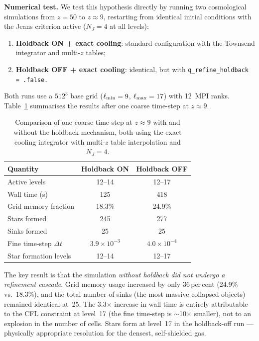 \documentclass[fleqn,usenatbib]{mnras}
\newcommand{\code}[1]{\texttt{#1}}
\begin{document}
\textbf{Numerical test.}
We test this hypothesis directly by running two cosmological
simulations from $z = 50$ to $z \approx 9$, restarting from
identical initial conditions with the Jeans criterion active
($N_J = 4$ at all levels):
\begin{enumerate}
  \item \textbf{Holdback ON + exact cooling}: standard configuration
    with the Townsend integrator and multi-$z$ tables;
  \item \textbf{Holdback OFF + exact cooling}: identical, but with
    \code{q\_refine\_holdback = .false.}
\end{enumerate}
Both runs use a $512^3$ base grid ($\ell_{\rm min}=9$,
$\ell_{\rm max}=17$) with 12~MPI ranks.
Table~\ref{tab:holdback_test} summarises the results after one
coarse time-step at $z \approx 9$.

\begin{table}
\centering
\caption{Comparison of one coarse time-step at $z \approx 9$ with
and without the holdback mechanism, both using the exact cooling
integrator with multi-$z$ table interpolation and $N_J = 4$.}
\label{tab:holdback_test}
\begin{tabular}{lcc}
\toprule
Quantity & Holdback ON & Holdback OFF \\
\midrule
Active levels              & 12--14  & 12--17 \\
Wall time (s)              & 125     & 418 \\
Grid memory fraction       & 18.3\%  & 24.9\% \\
Stars formed               & 245     & 277 \\
Sinks formed               & 25      & 25 \\
Fine time-step $\Delta t$  & $3.9 \times 10^{-3}$ & $4.0 \times 10^{-4}$ \\
Star formation levels      & 12--14  & 12--17 \\
\bottomrule
\end{tabular}
\end{table}

The key result is that the simulation \emph{without holdback did
not undergo a refinement cascade}.  Grid memory usage increased by
only 36\,per\,cent (24.9\% vs.\ 18.3\%), and the total number of
sinks (the most massive collapsed objects) remained identical at~25.
The 3.3$\times$ increase in wall time is entirely attributable to
the CFL constraint at level~17 (the fine time-step is
$\sim$10$\times$ smaller), not to an explosion in the number of
cells.  Stars form at level~17 in the holdback-off run ---
physically appropriate resolution for the densest, self-shielded
gas.
\end{document}
